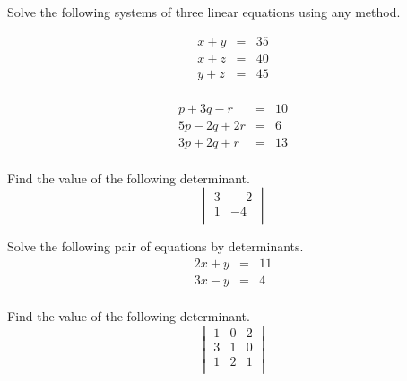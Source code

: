 \documentclass[12pt,letterpaper]{orulawork}
\newif\ifanswerkey
\newcommand{\answer}[1]{%
	\ifanswerkey%
		{\color{red}[Ans: #1]}%
	\fi%
}
\begin{document}
\begin{question}
	Solve the following systems of three linear equations using any method.
	\begin{exercises}
		\item%
		\begin{eqnarray*}
			x + y & = & 35 \\
			x + z & = & 40 \\
			y + z & = & 45 \\
		\end{eqnarray*} \answer{$x=15$, $y=20$ and $z=25$}
		\item%
		\begin{eqnarray*}
			p + 3q - r & = & 10 \\
			5p - 2q + 2r & = & 6 \\
			3p + 2q + r & = & 13 \\
		\end{eqnarray*} \answer{$p=2$, $q=3$ and $r=1$}
	\end{exercises}
\end{question}

\begin{question}
	Find the value of the following determinant.
	\begin{equation*}
		\begin{vmatrix}
			3 &  \phantom{-}2 \\
			1 & -4 \\
		\end{vmatrix}
	\end{equation*} \answer{$-14$}
\end{question}

\begin{question}
	Solve the following pair of equations by determinants.
	\begin{eqnarray*}
		2x + y & = & 11 \\
		3x - y & = & 4 \\
	\end{eqnarray*} \answer{$\Delta=-5$, $x=3$, and $y=5$}
\end{question}

\begin{question}
	Find the value of the following determinant.
	\begin{equation*}
		\begin{vmatrix}
			1 & 0 & 2 \\
			3 & 1 & 0 \\
			1 & 2 & 1 \\
		\end{vmatrix}
	\end{equation*} \answer{$11$}
\end{question}
\end{document}
